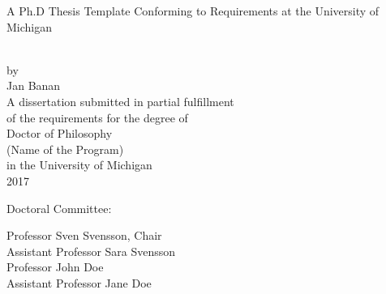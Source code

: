 \begin{titlepage}
 \begin{singlespace} %
  \hbox{\vspace{1.2in}} %
  \begin{center} %
   \begin{onehalfspacing}
    { A Ph.D Thesis Template Conforming to Requirements at the University of Michigan} %
   \end{onehalfspacing} \\[4ex] %
   by \\[2ex] %
   Jan Banan \\ %
   \vfill %
   A dissertation submitted in partial fulfillment \\ %
   of the requirements for the degree of \\ %
   Doctor of Philosophy \\ %
   (Name of the Program) \\ %
   in the University of Michigan \\ %
   2017 %
  \end{center} %
  \vfill %
  \begin{flushleft}
   \hspace{0.7in}Doctoral Committee: \\[2ex] %
   \hspace{1in} %
   \parbox{4.2in}{Professor Sven Svensson, Chair\\
   				  Assistant Professor Sara Svensson\\
   				  Professor John Doe\\
   				  Assistant Professor Jane Doe}
  \end{flushleft} %
 \end{singlespace} %
\end{titlepage}

\clearpage
\thispagestyle{empty}

\hspace{0pt}

\vfill

